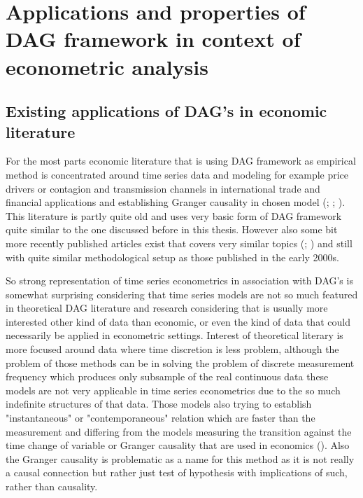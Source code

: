 \documentclass[main=english,12pt,a4paper,pdftex,econ,utf8]{aaltothesis}
\begin{document}
\clearpage

\section{Applications and properties of DAG framework in context of econometric analysis}

\subsection{Existing applications of DAG's in economic literature}

For the most parts economic literature that is using DAG framework as empirical method is concentrated around time series data and modeling for example price drivers or contagion and transmission channels in international trade and financial applications and establishing Granger causality in chosen model (\cite{Awokuse2003}; \cite{Bessler2003}; \cite{Yang2006}). This literature is partly quite old and uses very basic form of DAG framework quite similar to the one discussed before in this thesis. However also some bit more recently published articles exist that covers very similar topics (\cite{Jayech2016}; \cite{Ji2018}) and still with quite  similar methodological setup as those published in the early 2000s. 

So strong representation of time series econometrics in association with DAG's is somewhat surprising considering that time series models are not so much featured in theoretical DAG literature and research considering that is usually more interested other kind of data than economic, or even the kind of data that could necessarily be applied in econometric settings. Interest of theoretical literary is more focused around data where time discretion is less problem, although the problem of those methods can be in solving the problem of discrete measurement frequency which produces only subsample of the real continuous data these models are not very applicable in time series econometrics due to the so much indefinite structures of that data. Those models also trying to establish "instantaneous" or "contemporaneous" relation which are faster than the measurement and differing from the models measuring the transition against the time change of variable or Granger causality that are used in economics (\cite{Hyttinen2017}). Also the Granger causality is problematic as a name for this method as it is not really a causal connection but rather just test of hypothesis with implications of such, rather than causality.
\end{document}
